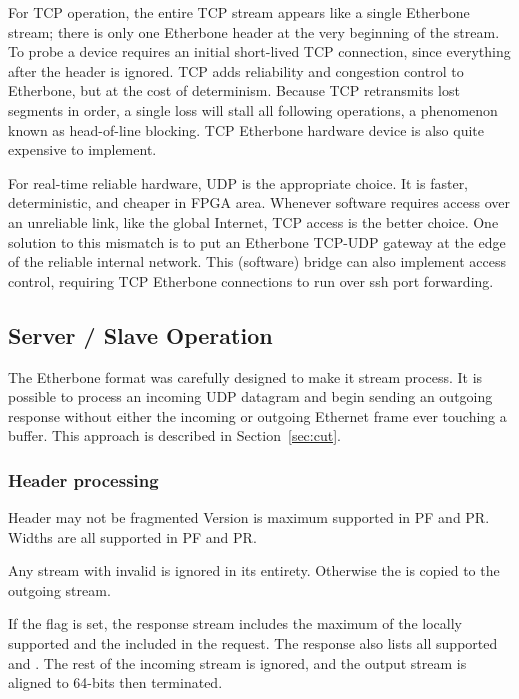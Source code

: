 \documentclass{article}
\begin{document}
For TCP operation,
the entire TCP stream appears like a single Etherbone stream;
there is only one Etherbone header at the very beginning of the stream.
To probe a device requires an initial short-lived TCP connection,
since everything after the header is ignored.
TCP adds reliability and congestion control to Etherbone,
but at the cost of determinism.
Because TCP retransmits lost segments in order,
a single loss will stall all following operations,
a phenomenon known as head-of-line blocking.
TCP Etherbone hardware device is also quite expensive to implement.

For real-time reliable hardware, UDP is the appropriate choice.
It is faster, deterministic, and cheaper in FPGA area.
Whenever software requires access over an unreliable link,
like the global Internet,
TCP access is the better choice.
One solution to this mismatch is to put an Etherbone TCP-UDP gateway
at the edge of the reliable internal network.
This (software) bridge can also implement access control,
requiring TCP Etherbone connections to run over ssh port forwarding.

\subsection{Server / Slave Operation}

The Etherbone format was carefully designed to make it stream process.
It is possible to process an incoming UDP datagram and
begin sending an outgoing response 
without either the incoming or outgoing Ethernet frame ever touching a buffer.
This approach is described in Section~\ref{sec:cut}.

\subsubsection{Header processing}

Header may not be fragmented
Version is maximum supported in PF and PR.
Widths are all supported in PF and PR.

Any stream with invalid  is ignored in its entirety.
Otherwise the  is copied to the outgoing stream.

If the  flag is set,
the response stream includes the maximum of the locally supported
 and the  included in the request.
The response also lists all supported  and .
The rest of the incoming stream is ignored,
and the output stream is aligned to 64-bits then terminated.
\end{document}
